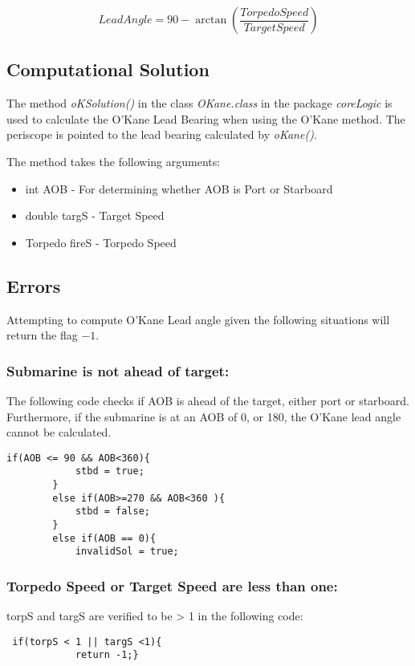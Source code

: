 \documentclass{article}
\begin{document}
$$ LeadAngle = 90 - \arctan\left( \frac{Torpedo Speed}{TargetSpeed} \right) $$

\subsection{Computational Solution}
The method \emph{oKSolution()} in the class \emph{OKane.class} in the package \emph{coreLogic} is used to calculate the O'Kane Lead Bearing when using the O'Kane method. The periscope is pointed to the lead bearing calculated by \emph{oKane()}.

The method takes the following arguments:

\begin{itemize}
\item{int AOB - For determining whether AOB is Port or Starboard}
\item{double targS - Target Speed}
\item{Torpedo fireS - Torpedo Speed}
\end{itemize}

\subsection{Errors}

Attempting to compute O'Kane Lead angle given the following situations will return the flag \emph{$-1$}.

\subsubsection{Submarine is not ahead of target:}
The following code checks if AOB is ahead of the target, either port or starboard.
Furthermore, if the submarine is at an AOB of 0, or 180, the O'Kane lead angle cannot be calculated.
\begin{lstlisting}
if(AOB <= 90 && AOB<360){
            stbd = true;
        }
        else if(AOB>=270 && AOB<360 ){
            stbd = false;
        }
        else if(AOB == 0){
            invalidSol = true;
\end{lstlisting}

\subsubsection{Torpedo Speed or Target Speed are less than one:}
torpS and targS are verified to be > 1 in the following code:
\begin{lstlisting}
 if(torpS < 1 || targS <1){
            return -1;}
\end{lstlisting}
\end{document}
